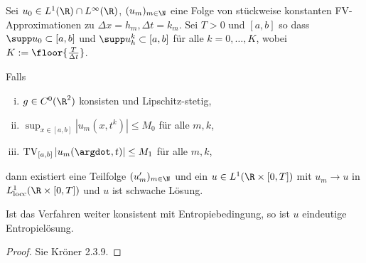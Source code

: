 \begin{st} \label{5.14}
    Sei $u_0 \in L^1(\R) \cap L^\infty(\R)$, $(u_m)_{m\in \N}$ eine Folge von stückweise konstanten FV-Approximationen zu $\Delta x = h_m, \Delta t = k_m$.
    Sei $T > 0$ und $[a,b]$ so dass $\supp u_0 \subset [a,b]$ und $\supp u_h^k \subset [a,b]$ für alle $k = 0, \dotsc, K$, wobei $K := \floor{\frac{T}{\Delta t}}$.

    Falls
    \begin{enumerate}[i)]
        \item
            $g \in C^0(\R^2)$ konsisten und Lipschitz-stetig,
        \item
            $\sup_{x\in [a,b]} |u_m(x,t^k)| \le M_0$ für alle $m, k$,
        \item
            $\TV_{[a,b]} |u_m(\argdot, t)| \le M_1$ für alle $m, k$,
    \end{enumerate}
    dann existiert eine Teilfolge $(u_m')_{m\in\N}$ und ein $u \in L^1(\R \times [0,T])$ mit $u_m \to u$ in $L^1_{\text{locc}}(\R \times [0,T])$ und $u$ ist schwache Lösung.

    Ist das Verfahren weiter konsistent mit Entropiebedingung, so ist $u$ eindeutige Entropielösung.
    \begin{proof}
        Sie Kröner 2.3.9.
    \end{proof}
\end{st}
